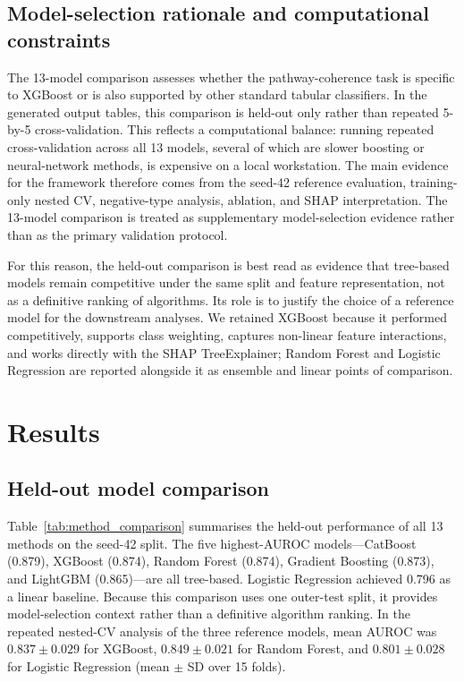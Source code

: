 \documentclass[12pt,letterpaper,oneside,openany]{book}
\begin{document}
\section{Model-selection rationale and computational constraints}
\label{sec:methods_model_rationale}

The 13-model comparison assesses whether the pathway-coherence task is specific to XGBoost or is also supported by other standard tabular classifiers. In the generated output tables, this comparison is held-out only rather than repeated 5-by-5 cross-validation. This reflects a computational balance: running repeated cross-validation across all 13 models, several of which are slower boosting or neural-network methods, is expensive on a local workstation. The main evidence for the framework therefore comes from the seed-42 reference evaluation, training-only nested CV, negative-type analysis, ablation, and SHAP interpretation. The 13-model comparison is treated as supplementary model-selection evidence rather than as the primary validation protocol.

For this reason, the held-out comparison is best read as evidence that tree-based models remain competitive under the same split and feature representation, not as a definitive ranking of algorithms. Its role is to justify the choice of a reference model for the downstream analyses. We retained XGBoost because it performed competitively, supports class weighting, captures non-linear feature interactions, and works directly with the SHAP TreeExplainer; Random Forest and Logistic Regression are reported alongside it as ensemble and linear points of comparison.


\chapter{Results}
\label{sec:results}

\section{Held-out model comparison}
\label{sec:res_model_comparison}

Table~\ref{tab:method_comparison} summarises the held-out performance of all 13 methods on the seed-42 split. The five highest-AUROC models---CatBoost (0.879), XGBoost (0.874), Random Forest (0.874), Gradient Boosting (0.873), and LightGBM (0.865)---are all tree-based. Logistic Regression achieved 0.796 as a linear baseline. Because this comparison uses one outer-test split, it provides model-selection context rather than a definitive algorithm ranking. In the repeated nested-CV analysis of the three reference models, mean AUROC was $0.837 \pm 0.029$ for XGBoost, $0.849 \pm 0.021$ for Random Forest, and $0.801 \pm 0.028$ for Logistic Regression (mean $\pm$ SD over 15 folds).
\end{document}
